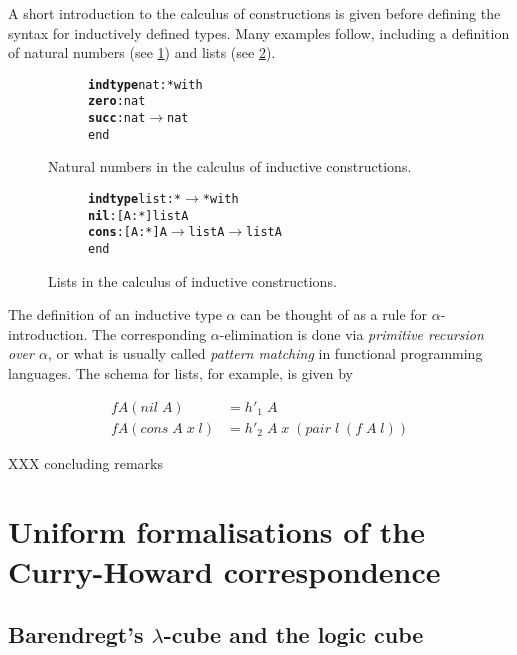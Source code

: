 \documentclass[12pt,toc=bibliography,numbers=noendperiod,
               footnotes=multiple,twoside]{scrartcl}
\begin{document}
A short introduction to the calculus of constructions is given before defining the syntax for inductively defined types. Many examples follow, including a definition of natural numbers (see \cref{fig:nat-inductive-type}) and lists (see \cref{fig:list-inductive-type}).

\begin{figure}[h]
\centering
\begin{subfigure}[t]{0.3\linewidth}
\begin{alltt}
\textbf{indtype} nat : * with
    \textbf{zero} : nat
    \textbf{succ} : nat \(\rightarrow\) nat
end
\end{alltt}
\end{subfigure}
\caption{Natural numbers in the calculus of inductive constructions.}
\label{fig:nat-inductive-type}
\end{figure}

\begin{figure}[h]
\centering
\begin{subfigure}[t]{0.4\linewidth}
\begin{alltt}
\textbf{indtype} list : * \(\rightarrow\) * with
    \textbf{nil}  : [A : *] list A
    \textbf{cons} : [A : *] A \(\rightarrow\) list A \(\rightarrow\) list A
end
\end{alltt}
\end{subfigure}
\caption{Lists in the calculus of inductive constructions.}
\label{fig:list-inductive-type}
\end{figure}

The definition of an inductive type \(\alpha\) can be thought of as a rule for \(\alpha\)-introduction. The corresponding \(\alpha\)-elimination is done via \emph{primitive recursion over \(\alpha\)}, or what is usually called \emph{pattern matching} in functional programming languages. The schema for lists, for example, is given by

\begin{align*}
f A (\textit{nil}\;A) &= h'_1\;A \\
f A (\textit{cons}\;A\;x\;l) &= h'_2\;A\;x\;(\textit{pair}\;l\;(f\;A\;l))
\end{align*}

XXX concluding remarks


\section{Uniform formalisations of the Curry-Howard correspondence}

\subsection{\label{ssc:cubes}Barendregt's \(\lambda\)-cube and the logic cube}
\end{document}
